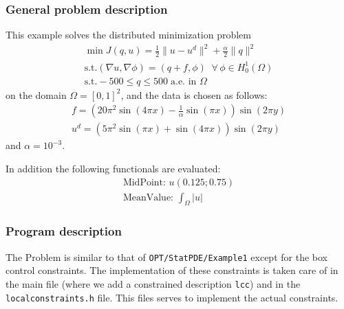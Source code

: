 \subsubsection{General problem description}
This example solves the distributed minimization problem
\begin{gather*}
\min J(q,u) = \frac{1}{2} \|u-u^d\|^2 + \frac{\alpha}{2}\|q\|^2\\
\text{s.t.} (\nabla u,\nabla \phi) = (q+f,\phi)\;\;\forall\,\phi \in H^1_0(\Omega)\\
\text{s.t.} -500 \le q \le 500\;\text{a.e. in }\Omega
\end{gather*}
on the domain $\Omega = [0,1]^2$, and the data is chosen as follows:
\begin{gather*}
 f = \left(20\pi^2  \sin(4 \pi x) - \frac{1}{\alpha}  \sin(\pi x)\right) \sin(2 \pi y)\\
 u^d = \left( 5 \pi^2 \sin(\pi x) + \sin(4 \pi x)\right)  \sin(2\pi y)
\end{gather*}
and $\alpha = 10^{-3}$.

In addition the following functionals are evaluated:
\begin{gather*}
  \text{MidPoint: } u(0.125 ; 0.75)\\[2mm]
  \text{MeanValue: }\int_\Omega |u|
\end{gather*}


\subsubsection{Program description}

The Problem is similar to that of {\tt OPT/StatPDE/Example1} except for the box 
control constraints.
The implementation of these constraints is taken care of in the main file
(where we add a constrained description \texttt{lcc}) and in the
\texttt{localconstraints.h} file. This files serves to implement the actual constraints.
 
